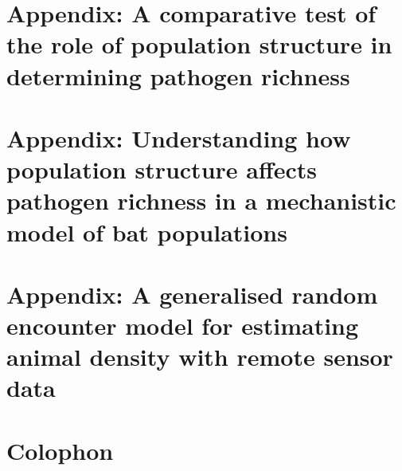 



\appendix

\chapter{Appendix: A comparative test of the role of population structure in determining pathogen richness}
\label{empirAppendix}




\chapter{Appendix: Understanding how population structure affects pathogen richness in a mechanistic model of bat populations}
\label{sims1Appendix}



\chapter{Appendix: A generalised random encounter model for estimating animal density with remote sensor data}
\label{gremAppendix}






\chapter{Colophon}
\label{appendixlabel3}


